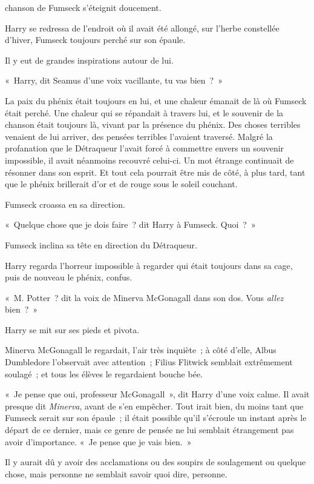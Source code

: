 
 chanson de Fumseck s'éteignit doucement.

\hplettrineextrapara
Harry se redressa de l'endroit où il avait été allongé, sur l'herbe constellée d'hiver, Fumseck toujours perché sur son épaule.

Il y eut de grandes inspirations autour de lui.

«~Harry, dit Seamus d'une voix vacillante, tu vas bien~?~»

La paix du phénix était toujours en lui, et une chaleur émanait de là où Fumseck était perché. Une chaleur qui se répandait à travers lui, et le souvenir de la chanson était toujours là, vivant par la présence du phénix. Des choses terribles venaient de lui arriver, des pensées terribles l'avaient traversé. Malgré la profanation que le Détraqueur l'avait forcé à commettre envers un souvenir impossible, il avait néanmoins recouvré celui-ci. Un mot étrange continuait de résonner dans son esprit. Et tout cela pourrait être mis de côté, à plus tard, tant que le phénix brillerait d'or et de rouge sous le soleil couchant.

Fumseck croassa en sa direction.

«~Quelque chose que je dois faire~? dit Harry à Fumseck. Quoi~?~»

Fumseck inclina sa tête en direction du Détraqueur.

Harry regarda l'horreur impossible à regarder qui était toujours dans sa cage, puis de nouveau le phénix, confus.

«~M. Potter~? dit la voix de Minerva McGonagall dans son dos. Vous \emph{allez} bien~?~»

Harry se mit sur ses pieds et pivota.

Minerva McGonagall le regardait, l'air très inquiète~; à côté d'elle, Albus Dumbledore l'observait avec attention~; Filius Flitwick semblait extrêmement soulagé~; et tous les élèves le regardaient bouche bée.

«~Je pense que oui, professeur McGonagall~», dit Harry d'une voix calme. Il avait presque dit \emph{Minerva}, avant de s'en empêcher. Tout irait bien, du moins tant que Fumseck serait sur son épaule~; il était possible qu'il s'écroule un instant après le départ de ce dernier, mais ce genre de pensée ne lui semblait étrangement pas avoir d'importance. «~Je pense que je vais bien.~»

Il y aurait dû y avoir des acclamations ou des soupirs de soulagement ou quelque chose, mais personne ne semblait savoir quoi dire, personne.

